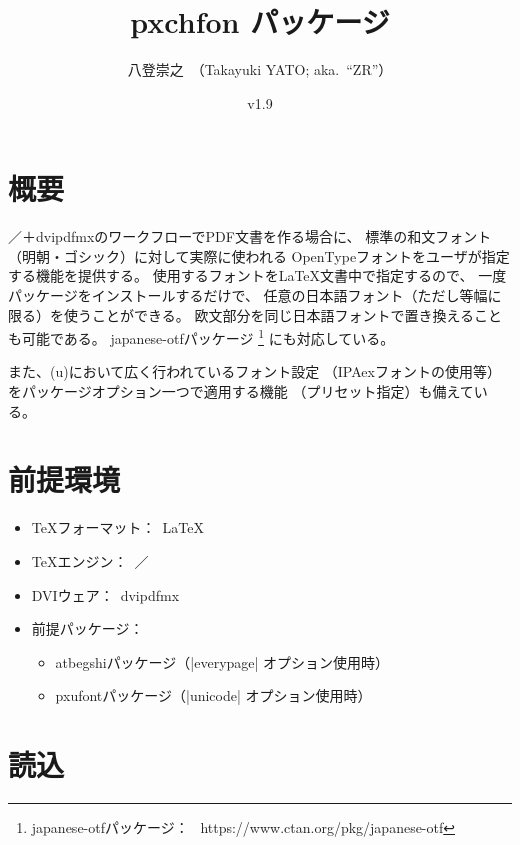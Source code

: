 \documentclass[uplatex,dvipdfmx,a4paper]{jsarticle}
\newcommand{\PkgVersion}{1.9}
\newcommand{\PkgDate}{2021/05/30}
\newcommand{\Pkg}[1]{\textsf{#1}}
\newcommand{\Means}{：\ }
\begin{document}
\title{\Pkg{pxchfon} パッケージ}
\author{八登崇之\ （Takayuki YATO; aka.~``ZR''）}
\date{v\PkgVersion\quad[\PkgDate]}
\maketitle
\tableofcontents

\section{概要}

{\pLaTeX}／{\upLaTeX}＋dvipdfmxのワークフローでPDF文書を作る場合に、
標準の和文フォント（明朝・ゴシック）に対して実際に使われる
OpenTypeフォントをユーザが指定する機能を提供する。
使用するフォントを{\LaTeX}文書中で指定するので、
一度パッケージをインストールするだけで、
任意の日本語フォント（ただし等幅に限る）を使うことができる。
欧文部分を同じ日本語フォントで置き換えることも可能である。
\Pkg{japanese-otf}パッケージ%
\footnote{\Pkg{japanese-otf}パッケージ\Means
  https://www.ctan.org/pkg/japanese-otf}%
にも対応している。

また、{(u)\pLaTeX}において広く行われているフォント設定
（IPAexフォントの使用等）をパッケージオプション一つで適用する機能
（プリセット指定）も備えている。

\section{前提環境}

\begin{itemize}
\item {\TeX}フォーマット\Means {\LaTeX}
\item {\TeX}エンジン\Means {\pTeX}／{\upTeX}
\item DVIウェア\Means dvipdfmx
\item 前提パッケージ\Means
  \begin{itemize}
  \item \Pkg{atbegshi}パッケージ（|everypage| オプション使用時）
  \item \Pkg{pxufont}パッケージ（|unicode| オプション使用時）
  \end{itemize}
\end{itemize}

\section{読込}
\label{sec:Loading}
\end{document}
